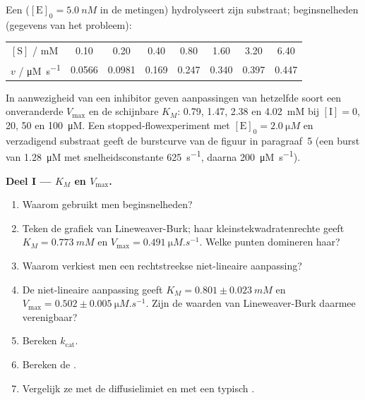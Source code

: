\begin{problem}
\label{pb:b3:complex-kinetics:1}
Een  ($[\mathrm E]_0 = \qty{5.0}{nM}$ in de metingen) hydrolyseert zijn
substraat; beginsnelheden (gegevens van het probleem):
\begin{center}\small
\begin{tabular}{lccccccc}
\hline
$[\mathrm S]$ / mM & 0.10 & 0.20 & 0.40 & 0.80 & 1.60 & 3.20 & 6.40 \\
$v$ / \unit{\micro M.s^{-1}} & 0.0566 & 0.0981 & 0.169 & 0.247 & 0.340 & 0.397 & 0.447 \\ \hline
\end{tabular}
\end{center}
In aanwezigheid van een inhibitor geven aanpassingen van hetzelfde soort
een onveranderde $V_{\max}$ en de schijnbare $K_M$: 0.79, 1.47, 2.38 en
\qty{4.02}{mM} bij $[\mathrm I] = 0$, 20, 50 en
\qty{100}{\micro M}. Een stopped-flowexperiment met $[\mathrm E]_0 = \qty{2.0}{\micro M}$ en
verzadigend substraat geeft de burstcurve van de figuur in paragraaf~5
(een burst van \qty{1.28}{\micro M}
met snelheidsconstante \qty{625}{s^{-1}}, daarna \qty{200}{\micro M.s^{-1}}).

\medskip\noindent\textbf{Deel I --- $K_M$ en $V_{\max}$.}
\begin{enumerate}
  \item Waarom gebruikt men beginsnelheden?
  \item Teken de grafiek van Lineweaver-Burk; haar
        kleinstekwadratenrechte geeft $K_M =
        \qty{0.773}{mM}$ en $V_{\max} = \qty{0.491}{\micro M.s^{-1}}$. Welke punten domineren haar?
  \item Waarom verkiest men een rechtstreekse niet-lineaire aanpassing?
  \item De niet-lineaire aanpassing geeft $K_M = 0.801 \pm \qty{0.023}{mM}$ en $V_{\max} = 0.502 \pm
        \qty{0.005}{\micro M.s^{-1}}$. Zijn de waarden van Lineweaver-Burk
        daarmee verenigbaar?
  \item Bereken $k_{\mathrm{cat}}$.
  \item Bereken de .
  \item Vergelijk ze met de diffusielimiet en met een typisch .
\end{enumerate}


\end{problem}
